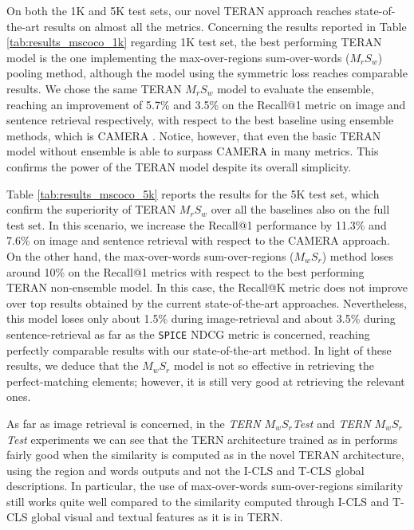 \documentclass[acmsmall]{acmart}
\newcommand{\majorrevised}[1]{#1}
\begin{document}
\majorrevised{
On both the 1K and 5K test sets, our novel TERAN approach reaches state-of-the-art results on almost all the metrics.
Concerning the results reported in Table \ref{tab:results_mscoco_1k} regarding 1K test set, the best performing TERAN model is the one implementing the max-over-regions sum-over-words ($M_{r}S_{w}$) pooling method, although the model using the symmetric loss reaches comparable results. We chose the same TERAN $M_{r}S_{w}$ model to evaluate the ensemble, reaching an improvement of 5.7\% and 3.5\% on the Recall@1 metric on image and sentence retrieval respectively, with respect to the best baseline using ensemble methods, which is CAMERA \cite{qu2020context}. Notice, however, that even the basic TERAN model without ensemble is able to surpass CAMERA in many metrics. This confirms the power of the TERAN model despite its overall simplicity.

Table \ref{tab:results_mscoco_5k} reports the results for the 5K test set, which confirm the superiority of TERAN $M_{r}S_{w}$ over all the baselines also on the full test set. In this scenario, we increase the Recall@1 performance by 11.3\% and 7.6\% on image and sentence retrieval with respect to the CAMERA approach.}
On the other hand, the max-over-words sum-over-regions ($M_{w}S_{r}$) method loses around 10\% on the Recall@1 metrics with respect to the best performing TERAN non-ensemble model. In this case, the Recall@K metric does not improve over top results obtained by the current state-of-the-art approaches. Nevertheless, this model loses only about 1.5\% during image-retrieval and about 3.5\% during sentence-retrieval as far as the \texttt{SPICE} NDCG metric is concerned, reaching perfectly comparable results with our state-of-the-art method.
In light of these results, we deduce that the $M_{w}S_{r}$ model is not so effective in retrieving the perfect-matching elements; however, it is still very good at retrieving the relevant ones.

As far as image retrieval is concerned, in the \textit{TERN $M_{w}S_{r}$Test} and \textit{TERN $M_{w}S_{r}$Test} experiments we can see that the TERN architecture trained as in \cite{messina2020tern} performs fairly good when the similarity is computed as in the novel TERAN architecture, using the region and words outputs and not the I-CLS and T-CLS global descriptions. In particular, the use of max-over-words sum-over-regions similarity still works quite well compared to the similarity computed through I-CLS and T-CLS global visual and textual features as it is in TERN.
\end{document}
